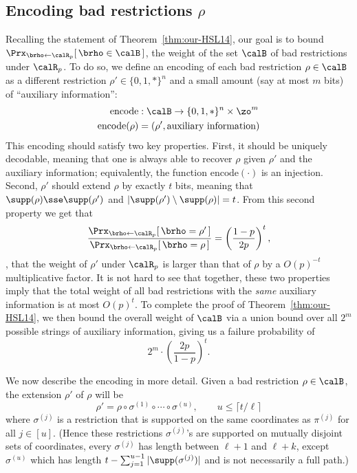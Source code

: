 \documentclass{toc}
\theoremstyle{plain}
\newcommand{\encode}{\mathrm{encode}}
\begin{document}
\subsection{Encoding bad restrictions $\rho$} 

Recalling the statement of Theorem~\ref{thm:our-HSL14}, our goal is to bound $\Prx_{\brho\leftarrow\calR_p}[\, \text{$\brho \in \calB$}\,]$, the weight of the set $\calB$ of bad restrictions under $\calR_p$. To do so, we define an encoding of each bad restriction $\rho \in \calB$ as a different restriction $\rho' \in \{0,1,\ast\}^n$ and a small amount (say at most $m$ bits) of ``auxiliary information'':  
\begin{align*}
\encode &: \calB \to \{0,1,\ast\}^n \times \zo^m \\
\encode(\rho) &= (\rho', \text{auxiliary information}) 
\end{align*}
This encoding should satisfy two key properties. First, it should be uniquely decodable, meaning that one is always able to recover $\rho$ given $\rho'$ and the auxiliary information; equivalently, the function $\encode(\cdot)$ is an injection.  Second, $\rho'$ should extend $\rho$ by exactly $t$ bits, meaning that $\supp(\rho) \sse \supp(\rho')$ and $|\supp(\rho') \setminus \supp(\rho)| = t$.  From this second property we get that 
\[ \frac{\Prx_{\brho\leftarrow\calR_p}[\, \brho = \rho'\,]}{\Prx_{\brho\leftarrow\calR_p}[\,\brho = \rho\,]} = \left(\frac{1-p}{2p}\right)^t, \] 
\ie, that the weight of $\rho'$ under $\calR_p$ is larger than that of $\rho$ by a $O(p)^{-t}$ multiplicative factor.  It is not hard to see that together, these two properties imply that the total weight of all bad restrictions with the \emph{same} auxiliary information is at most $O(p)^t$.  To complete the proof of Theorem~\ref{thm:our-HSL14}, we then bound the overall weight of $\calB$ via a union bound over all $2^m$ possible strings of auxiliary information, giving us a failure probability of 
\begin{equation} 2^m \cdot \left(\frac{2p}{1-p}\right)^t. 
\label{eq:failure-probability}
\end{equation} 

We now describe the encoding in more detail.  Given a bad restriction $\rho \in \calB$, the extension $\rho'$ of $\rho$ will be 
\begin{equation} \rho' = \rho\circ \sigma^{(1)} \circ\cdots\circ\sigma^{(u)}, \qquad u \le \lceil t/\ell \rceil \label{eq:our-encoding}
\end{equation} 
where $\sigma^{(j)}$ is a restriction that is supported on the same coordinates as $\pi^{(j)}$ for all $j\in [u]$.  (Hence these restrictions $\sigma^{(j)}$'s are supported on mutually disjoint sets of coordinates, every $\sigma^{(j)}$ has length between $\ell + 1$ and $\ell+k$, except $\sigma^{(u)}$ which has length $t - \sum_{j=1}^{u-1} |\supp(\sigma^{(j)})|$ and is not necessarily a full path.) 
\end{document}
